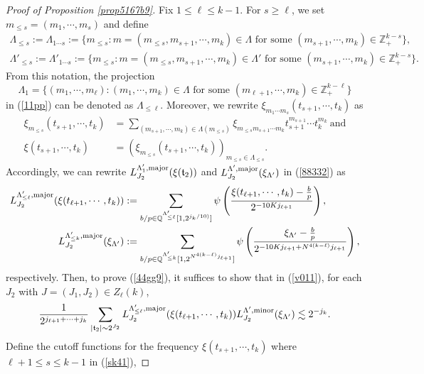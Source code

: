 \documentclass[11 pt,letterpaper]{amsart}
\theoremstyle{plain}
\theoremstyle{definition}
\theoremstyle{remark} \theoremstyle{exam} \theoremstyle{ob}
\numberwithin{equation}{section}
\begin{document}
\begin{proof}[Proof of Proposition \ref{prop5167b9}]
Fix $1\le \ell \le  k-1$. For $s\ge \ell$, we set $m_{\le s}=(m_1,\cdots,m_s)$ and define
\begin{align*}
	 \Lambda_{\le s}:=\Lambda_{1\cdots s}:=\{m_{\le s}:m=(m_{\le s}, m_{s+1},\cdots,m_k)\in \Lambda \text{ for some } (m_{s+1},\cdots,m_k)\in\mathbb{Z}_{+}^{k-s}\},\\
	 \Lambda'_{\le s}:=\Lambda'_{1\cdots s}:=\{m_{\le s}:m=(m_{\le s}, m_{s+1},\cdots,m_k)\in \Lambda' \text{ for some } (m_{s+1},\cdots,m_k)\in\mathbb{Z}_{+}^{k-s}\}.
\end{align*}
From this notation,  the projection $$\Lambda_{1}=\{(m_1,\cdots,m_\ell):(m_1,\cdots,m_k)\in \Lambda \text{ for some } (m_{\ell+1},\cdots,m_k)\in\mathbb{Z}_{+}^{k-\ell}\}$$ in (\ref{11pp}) can  be denoted as $\Lambda_{\le \ell}$. 
Moreover,  we rewrite $\xi_{m_1\cdots m_s}(t_{s+1},\cdots, t_k)$ as
\begin{align}
\xi_{m_{\le s}}(t_{s+1},\cdots,t_k)&=\sum_{(m_{s+1},\cdots,m_k)\in \Lambda(m_{\le s})} \xi_{m_{\le s} m_{s+1}\cdots m_k} t_{s+1}^{m_{s+1}}\cdots t_k^{m_k}\ \text{and}\nonumber\\
  \xi(t_{s+1},\cdots,t_k)&=(\xi_{m_{\le s} }(t_{s+1},\cdots, t_k))_{m_{\le s}\in \Lambda_{\le s}}.\label{sk41}
\end{align}
Accordingly, we can rewrite $L^{\Lambda_{1}',\rm{major}}_{J_2}(\xi(\mathfrak{t}_2) )$ and $L^{\Lambda',\rm{major}}_{J_2}(\xi_{\Lambda'})$ in (\ref{88332}) as
\begin{align*}
 L^{\Lambda_{\le \ell}',\rm{major}}_{J_2}(\xi(t_{\ell+1},\cdots,t_k) )&:=\sum_{b/p\in \mathbb{Q}^{\Lambda'_{\le \ell}}[1,2^{j_{k}/10)} ]}\psi\left(\frac{\xi(t_{\ell+1},\cdots,t_k)-\frac{b}{p}}{ 2^{-10Kj_{\ell+1} } }\right),\nonumber \\
 L^{\Lambda_{\le k}',\rm{major}}_{J_2}(\xi_{\Lambda'} )&:=\sum_{b/p\in \mathbb{Q}^{\Lambda'_{\le k}}[1,2^{N^{4(k-\ell)}j_{\ell+1}} ]}\psi\left(\frac{\xi_{\Lambda'}-\frac{b}{p}}{ 2^{-10Kj_{\ell+1} +N^{4 (k-\ell)}j_{\ell+1}} }\right),
\end{align*}
respectively.
Then, to prove (\ref{44gg9}),  it suffices to show that  in (\ref{v011}), for  each $J_2$ with $J=(J_1,J_2)\in Z_{\ell}(k)$,
\begin{align} \label{rara}
  \frac{1}{2^{j_{\ell+1}+\cdots+j_k}}  \sum_{|\mathfrak{t}_{2}|\sim 2^{J_2}}  
L^{\Lambda_{\le \ell}',\rm{major}}_{J_2}(\xi(t_{\ell+1},\cdots,t_k) )L^{\Lambda',\rm{minor}}_{J_2}(\xi_{\Lambda'})\lesssim 2^{- j_{k}}.
\end{align} 
Define the cutoff functions  for the frequency  $\xi(t_{s+1},\cdots,t_k)$ where $\ell+1\le  s\le k-1$ in (\ref{sk41}),

\end{proof}
\end{document}
